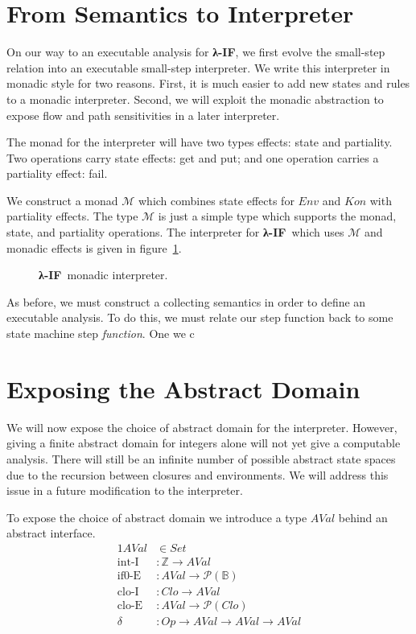 \documentclass[pldi]{sigplanconf}
\makeatletter
\newcommand{\lamif}{\textbf{λ-IF}\@}
\newcommand{\intI}{\operatorname{int-I}}
\newcommand{\ifzE}{\operatorname{if0-E}}
\newcommand{\cloI}{\operatorname{clo-I}}
\newcommand{\cloE}{\operatorname{clo-E}}
\makeatother
\begin{document}

\section{From Semantics to Interpreter}

On our way to an executable analysis for \lamif, we first evolve the small-step relation into an executable small-step interpreter.
We write this interpreter in monadic style for two reasons.
First, it is much easier to add new states and rules to a monadic interpreter.
Second, we will exploit the monadic abstraction to expose flow and path sensitivities in a later interpreter.

The monad for the interpreter will have two types effects: state and partiality.
Two operations carry state effects: get and put; and one operation carries a partiality effect: fail.

We construct a monad $ℳ $ which combines state effects for $Env$ and $Kon$ with partiality effects.
The type $ℳ $ is just a simple type which supports the monad, state, and partiality operations.
The interpreter for \lamif\ which uses $ℳ $ and monadic effects is given in figure~\ref{lamif:minterpreter}.

\begin{figure}[t]
\caption{\lamif\ monadic interpreter.}
\label{lamif:minterpreter}
{\scriptsize

}
\end{figure}

As before, we must construct a collecting semantics in order to define an executable analysis.
To do this, we must relate our step function back to some state machine step \emph{function}.
One we c %


\section{Exposing the Abstract Domain}

We will now expose the choice of abstract domain for the interpreter.
However, giving a finite abstract domain for integers alone will not yet give a computable analysis.
There will still be an infinite number of possible abstract state spaces due to the recursion between closures and environments.
We will address this issue in a future modification to the interpreter.

To expose the choice of abstract domain we introduce a type $AVal$ behind an abstract interface.
\begin{alignat*}{1}
    AVal &∈ Set                \\
   \intI &: ℤ → AVal           \\
   \ifzE &: AVal → 𝒫 (𝔹)       \\
   \cloI &: Clo → AVal         \\
   \cloE &: AVal → 𝒫 (Clo)     \\
  \delta &: Op → AVal → AVal → AVal
\end{alignat*}
\end{document}
